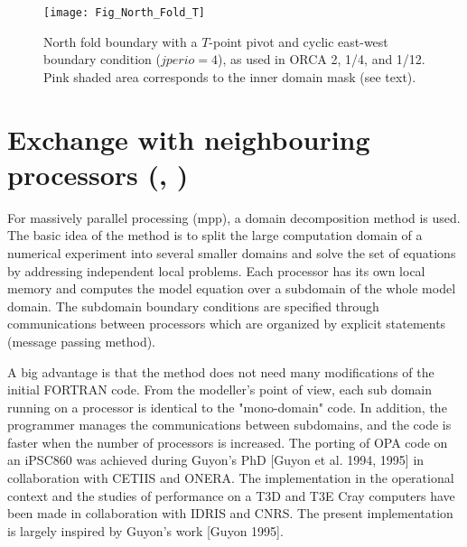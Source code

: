 \documentclass[../tex_main/NEMO_manual]{subfiles}
\begin{document}
\begin{figure}[!t]    \begin{center}
\texttt{[image: Fig\_North\_Fold\_T]}
\caption{    \protect\label{fig:North_Fold_T} 
North fold boundary with a $T$-point pivot and cyclic east-west boundary condition 
($jperio=4$), as used in ORCA 2, 1/4, and 1/12. Pink shaded area corresponds 
to the inner domain mask (see text). }
\end{center}   \end{figure}

\section{Exchange with neighbouring processors (\protect{}, \protect{})}
\label{sec:LBC_mpp}

For massively parallel processing (mpp), a domain decomposition method is used. 
The basic idea of the method is to split the large computation domain of a numerical 
experiment into several smaller domains and solve the set of equations by addressing 
independent local problems. Each processor has its own local memory and computes 
the model equation over a subdomain of the whole model domain. The subdomain 
boundary conditions are specified through communications between processors 
which are organized by explicit statements (message passing method). 

A big advantage is that the method does not need many modifications of the initial 
FORTRAN code. From the modeller's point of view, each sub domain running on 
a processor is identical to the "mono-domain" code. In addition, the programmer 
manages the communications between subdomains, and the code is faster when 
the number of processors is increased. The porting of OPA code on an iPSC860 
was achieved during Guyon's PhD [Guyon et al. 1994, 1995] in collaboration with 
CETIIS and ONERA. The implementation in the operational context and the studies 
of performance on a T3D and T3E Cray computers have been made in collaboration 
with IDRIS and CNRS. The present implementation is largely inspired by Guyon's 
work  [Guyon 1995].
\end{document}
